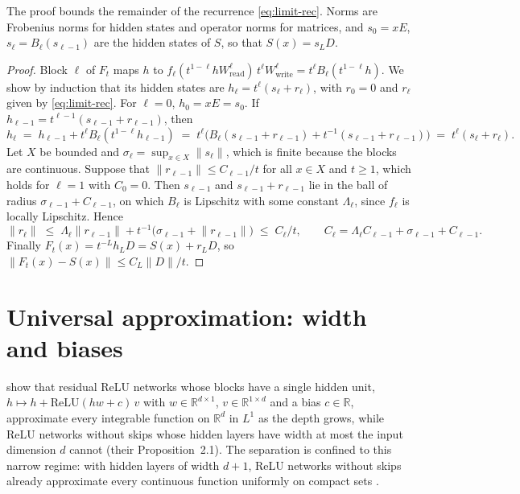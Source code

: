 \documentclass[10pt]{article}
\theoremstyle{definition}
\theoremstyle{remark}
\newcommand{\R}{\mathbb{R}}
\newcommand{\Wread}{W_{\mathrm{read}}}
\newcommand{\Wwrite}{W_{\mathrm{write}}}
\newcommand{\norm}[1]{\lVert #1\rVert}
\begin{document}
\propLimits*

The proof bounds the remainder of the recurrence \cref{eq:limit-rec}. Norms are Frobenius norms for hidden states and operator norms for matrices, and $s_0 = xE$, $s_\ell = B_\ell(s_{\ell-1})$ are the hidden states of $S$, so that $S(x) = s_LD$.

\begin{proof}
Block $\ell$ of $F_t$ maps $h$ to $f_\ell(t^{1-\ell}h\Wread^{\ell})\,t^\ell\Wwrite^{\ell} = t^\ell B_\ell(t^{1-\ell}h)$. We show by induction that its hidden states are $h_\ell = t^\ell(s_\ell + r_\ell)$, with $r_0 = 0$ and $r_\ell$ given by \cref{eq:limit-rec}. For $\ell = 0$, $h_0 = xE = s_0$. If $h_{\ell-1} = t^{\ell-1}(s_{\ell-1} + r_{\ell-1})$, then
\[
h_\ell \;=\; h_{\ell-1} + t^\ell B_\ell(t^{1-\ell}h_{\ell-1}) \;=\; t^\ell\big(B_\ell(s_{\ell-1} + r_{\ell-1}) + t^{-1}(s_{\ell-1} + r_{\ell-1})\big) \;=\; t^\ell(s_\ell + r_\ell).
\]
Let $X$ be bounded and $\sigma_\ell = \sup_{x \in X}\norm{s_\ell}$, which is finite because the blocks are continuous. Suppose that $\norm{r_{\ell-1}} \le C_{\ell-1}/t$ for all $x \in X$ and $t \ge 1$, which holds for $\ell = 1$ with $C_0 = 0$. Then $s_{\ell-1}$ and $s_{\ell-1} + r_{\ell-1}$ lie in the ball of radius $\sigma_{\ell-1} + C_{\ell-1}$, on which $B_\ell$ is Lipschitz with some constant $\Lambda_\ell$, since $f_\ell$ is locally Lipschitz. Hence
\[
\norm{r_\ell} \;\le\; \Lambda_\ell\norm{r_{\ell-1}} + t^{-1}\big(\sigma_{\ell-1} + \norm{r_{\ell-1}}\big) \;\le\; C_\ell/t, \qquad C_\ell = \Lambda_\ell C_{\ell-1} + \sigma_{\ell-1} + C_{\ell-1}.
\]
Finally $F_t(x) = t^{-L}h_LD = S(x) + r_LD$, so $\norm{F_t(x) - S(x)} \le C_L\norm{D}/t$.
\end{proof}

\section{Universal approximation: width and biases}\label{app:universal}

\citet{lin2018resnet} show that residual ReLU networks whose blocks have a single hidden unit, $h \mapsto h + \mathrm{ReLU}(hw + c)\,v$ with $w \in \R^{d\times 1}$, $v \in \R^{1\times d}$ and a bias $c \in \R$, approximate every integrable function on $\R^d$ in $L^1$ as the depth grows, while ReLU networks without skips whose hidden layers have width at most the input dimension $d$ cannot (their Proposition~2.1). The separation is confined to this narrow regime: with hidden layers of width $d + 1$, ReLU networks without skips already approximate every continuous function uniformly on compact sets \citep{hanin2017approximating}.
\end{document}

